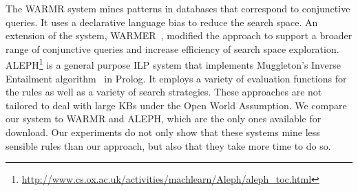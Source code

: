 The WARMR system \cite{DehToi99,DehToi00} mines patterns in data\-bases that correspond to conjunctive queries. It uses a declarative language bias to reduce the search space. 
An extension of the system, WARMER~\cite{GoeVan02}, modified the approach to support a broader range of conjunctive queries and increase efficiency of search space exploration. 
ALEPH\footnote{\label{foot:aleph}\url{http://www.cs.ox.ac.uk/activities/machlearn/Aleph/aleph_toc.html}} is a general purpose ILP system that implements Muggleton's Inverse Entailment algorithm~\cite{Muggleton95inverseentailment} in Prolog. 
It employs a variety of evaluation functions for the rules as well as a variety of search strategies. 
These approaches are not tailored to deal with large KBs under the Open World Assumption. 
We compare our system to WARMR and ALEPH, which are the only ones available for download. 
Our experiments do not only show that these systems mine less sensible rules than our approach, but also that they take more time to do so.

